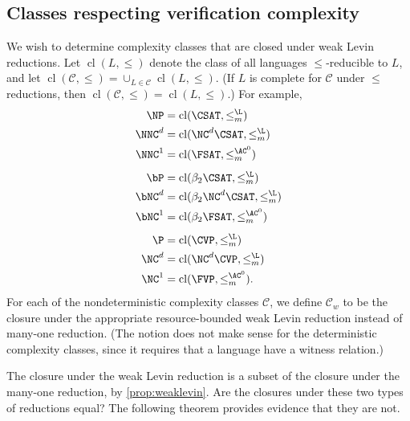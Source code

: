 \documentclass{article}
\DeclareMathOperator{\cl}{cl}
\begin{document}
\subsection{Classes respecting verification complexity}

We wish to determine complexity classes that are closed under weak Levin reductions.
Let $\cl(L, \leq)$ denote the class of all languages $\leq$-reducible to $L$, and let $\cl(\mathcal{C}, \leq) = \cup_{L \in \mathcal{C}} \cl(L, \leq)$.
(If $L$ is complete for $\mathcal{C}$ under $\leq$ reductions, then $\cl(\mathcal{C}, \leq) = \cl(L, \leq)$.)
For example,
\begin{align*}
  \NP & = \cl(\CSAT, \leq^\L_m) \\
  \NNC^d & = \cl(\NC^d \CSAT, \leq^\L_m) \\
  \NNC^1 & = \cl(\FSAT, \leq^{\AC^0}_m) \\[1ex]
  \bP & = \cl(\beta_2 \CSAT, \leq^\L_m) \\
  \bNC^d & = \cl(\beta_2 \NC^d \CSAT, \leq^\L_m) \\
  \bNC^1 & = \cl(\beta_2 \FSAT, \leq^{\AC^0}_m) \\[1ex]
  \P & = \cl(\CVP, \leq^\L_m) \\
  \NC^d & = \cl(\NC^d \CVP, \leq^\L_m) \\
  \NC^1 & = \cl(\FVP, \leq^{\AC^0}_m).
\end{align*}
For each of the nondeterministic complexity classes $\mathcal{C}$, we define $\mathcal{C}_w$ to be the closure under the appropriate resource-bounded weak Levin reduction instead of many-one reduction.
(The notion does not make sense for the deterministic complexity classes, since it requires that a language have a witness relation.)


The closure under the weak Levin reduction is a subset of the closure under the many-one reduction, by \autoref{prop:weaklevin}.
Are the closures under these two types of reductions equal?
The following theorem provides evidence that they are not.
\end{document}

